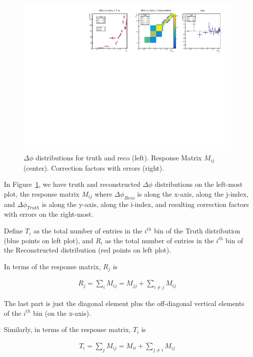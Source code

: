 
\begin{figure}
	\centering
	\includegraphics[width=1.0\textwidth]{figures/c.pdf} 
	\caption{ $\Delta\phi$ distributions for truth and reco (left). Response Matrix $M_{ij}$ (center). Correction factors with errors (right). }	
	\label{fig:plots}
\end{figure}

In Figure~\ref{fig:plots}, we have truth and reconstructed $\Delta\phi$ distributions on the left-most plot, the response matrix $M_{ij}$ where $\Delta\phi_{Reco}$ is along the x-axis, along the j-index, and $\Delta\phi_{Truth}$ is along the y-axis, along the i-index, and resulting correction factors with errors on the right-most. 

Define $T_{i}$ as the total number of entries in the $i^{th}$ bin of the Truth distribution (blue points on left plot), and $R_{i}$ as the total number of entries in the $i^{th}$ bin of the Reconstructed distribution (red points on left plot). 

In terms of the response matrix, $R_{j}$ is

\begin{eqnarray} \label{eq:rj}
R_j = \sum_{i}^{}M_{ij} = M_{jj} + \sum_{i\neq j}^{}M_{ij} 
\end{eqnarray}

The last part is just the diagonal element plus the off-diagonal vertical elements of the $i^{th}$ bin (on the x-axis).

Similarly, in terms of the response matrix, $T_{i}$ is

\begin{eqnarray} \label{eq:ti}
T_i = \sum_{j}^{}M_{ij} = M_{ii} + \sum_{j\neq i}^{}M_{ij} 
\end{eqnarray}

